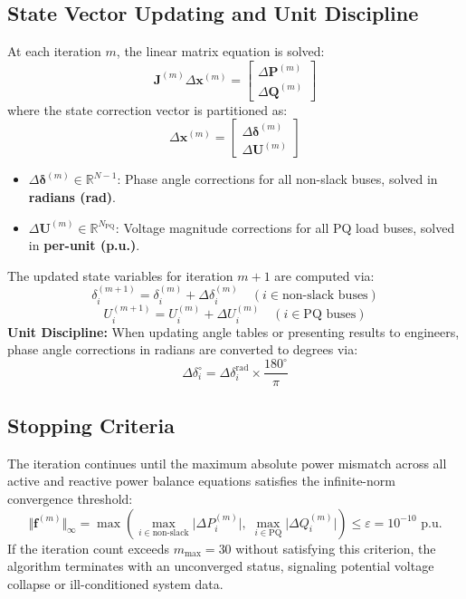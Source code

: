 \documentclass[12pt,a4paper,oneside]{report}
\begin{document}
\subsection{State Vector Updating and Unit Discipline}
At each iteration $m$, the linear matrix equation is solved:
\begin{equation}
\mathbf{J}^{(m)} \Delta \mathbf{x}^{(m)} = \begin{bmatrix} \Delta \mathbf{P}^{(m)} \\ \Delta \mathbf{Q}^{(m)} \end{bmatrix}
\end{equation}
where the state correction vector is partitioned as:
\begin{equation}
\Delta \mathbf{x}^{(m)} = \begin{bmatrix} \Delta \boldsymbol{\delta}^{(m)} \\ \Delta \mathbf{U}^{(m)} \end{bmatrix}
\end{equation}
\begin{itemize}
    \item $\Delta \boldsymbol{\delta}^{(m)} \in \mathbb{R}^{N-1}$: Phase angle corrections for all non-slack buses, solved in \textbf{radians (rad)}.
    \item $\Delta \mathbf{U}^{(m)} \in \mathbb{R}^{N_{\text{PQ}}}$: Voltage magnitude corrections for all PQ load buses, solved in \textbf{per-unit (p.u.)}.
\end{itemize}

The updated state variables for iteration $m+1$ are computed via:
\begin{equation}
\delta_i^{(m+1)} = \delta_i^{(m)} + \Delta \delta_i^{(m)} \quad (i \in \text{non-slack buses})
\end{equation}
\begin{equation}
U_i^{(m+1)} = U_i^{(m)} + \Delta U_i^{(m)} \quad (i \in \text{PQ buses})
\end{equation}
\textbf{Unit Discipline:} When updating angle tables or presenting results to engineers, phase angle corrections in radians are converted to degrees via:
\begin{equation}
\Delta \delta_i^\circ = \Delta \delta_i^{\text{rad}} \times \frac{180^\circ}{\pi}
\end{equation}

\subsection{Stopping Criteria}
The iteration continues until the maximum absolute power mismatch across all active and reactive power balance equations satisfies the infinite-norm convergence threshold:
\begin{equation}
\Vert \mathbf{f}^{(m)} \Vert_\infty = \max \left( \max_{i \in \text{non-slack}} \vert{}\Delta P_i^{(m)}\vert{}, \; \max_{i \in \text{PQ}} \vert{}\Delta Q_i^{(m)}\vert{} \right) \le \varepsilon = 10^{-10}\text{ p.u.}
\end{equation}
If the iteration count exceeds $m_{\max} = 30$ without satisfying this criterion, the algorithm terminates with an unconverged status, signaling potential voltage collapse or ill-conditioned system data.
\end{document}
